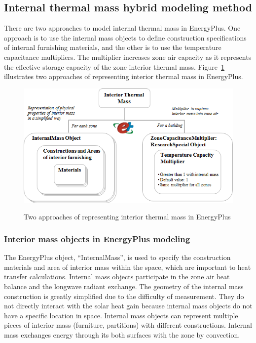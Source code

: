 \subsection{Internal thermal mass hybrid modeling method}\label{internal-thermal-mass-hybrid-modeling method}

There are two approaches to model internal thermal mass in EnergyPlus. One approach is to use the internal mass objects to define construction specifications of internal furnishing materials, and the other is to use the temperature capacitance multipliers. The multiplier increases zone air capacity as it represents the effective storage capacity of the zone interior thermal mass. Figure~\ref {fig:two-approaches-of-representing-interior-thermal-mass-in-EnergyPlus} illustrates two approaches of representing interior thermal mass in EnergyPlus.

\begin{figure}[h]
\begin{center}
\includegraphics[width=428pt]{media/img_HybridModel-2.png}
\caption{Two approaches of representing interior thermal mass in EnergyPlus}\protect \label{fig:two-approaches-of-representing-interior-thermal-mass-in-EnergyPlus}
\end{center}
\end{figure}
{\small  }


\subsubsection{Interior mass objects in EnergyPlus modeling}\label{interior-mass-objects-in-EnergyPlus-modeling}

The EnergyPlus object, “InternalMass”, is used to specify the construction materials and area of interior mass within the space, which are important to heat transfer calculations. Internal mass objects participate in the zone air heat balance and the longwave radiant exchange. The geometry of the internal mass construction is greatly simplified due to the difficulty of measurement. They do not directly interact with the solar heat gain because internal mass objects do not have a specific location in space. Internal mass objects can represent multiple pieces of interior mass (furniture, partitions) with different constructions. Internal mass exchanges energy through its both surfaces with the zone by convection. 

